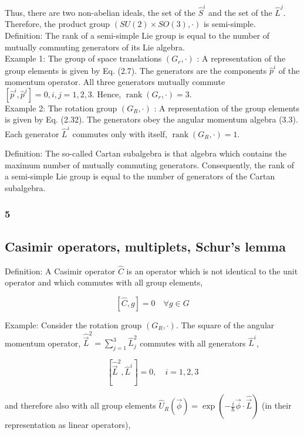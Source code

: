 \documentclass[10pt, letterpaper]{article}
\begin{document}
Thus, there are two non-abelian ideals, the set of the $\hat{S}^{i}$ and the set of the $\hat{L}^{j}$. Therefore, the product group $(S U(2) \times S O(3), \cdot)$ is semi-simple.\\
Definition: The rank of a semi-simple Lie group is equal to the number of mutually commuting generators of its Lie algebra.\\
Example 1: The group of space translations $\left(G_{r}, \cdot\right)$ : A representation of the group elements is given by Eq. (2.7). The generators are the components $\hat{p}^{i}$ of the momentum operator. All three generators mutually commute $\left[\hat{p}^{i}, \hat{p}^{j}\right]=0, i, j=1,2,3$. Hence, $\operatorname{rank}\left(G_{r}, \cdot\right)=3$.\\
Example 2: The rotation group $\left(G_{R}, \cdot\right)$ : A representation of the group elements is given by Eq. (2.32). The generators obey the angular momentum algebra (3.3). Each generator $\hat{L}^{i}$ commutes only with itself, $\operatorname{rank}\left(G_{R}, \cdot\right)=1$.

Definition: The so-called Cartan subalgebra is that algebra which contains the maximum number of mutually commuting generators. Consequently, the rank of a semi-simple Lie group is equal to the number of generators of the Cartan subalgebra.

\subsubsection{5}
\subsection{Casimir operators, multiplets, Schur's lemma}
Definition: A Casimir operator $\hat{C}$ is an operator which is not identical to the unit operator and which commutes with all group elements,

$$
[\hat{C}, g]=0 \quad \forall g \in G
$$

Example: Consider the rotation group $\left(G_{R}, \cdot\right)$. The square of the angular momentum operator, $\hat{\vec{L}}^{2}=\sum_{j=1}^{3} \hat{L}_{j}^{2}$ commutes with all generators $\hat{L}^{i}$,

$$
\left[\hat{\vec{L}}^{2}, \hat{L}^{i}\right]=0, \quad i=1,2,3
$$

and therefore also with all group elements $\hat{U}_{R}(\vec{\phi})=\exp \left(-\frac{i}{\hbar} \vec{\phi} \cdot \hat{\vec{L}}\right)$ (in their representation as linear operators),
\end{document}
